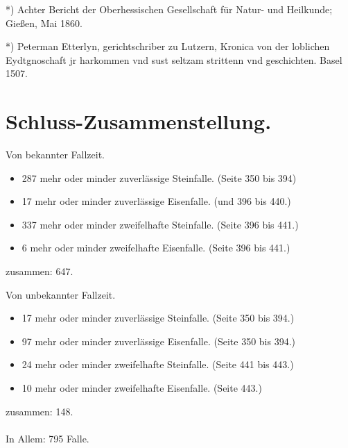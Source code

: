 \documentclass[a4paper, 8pt, oneside, polutonikogreek, german]{article}
\begin{document}
*) Achter Bericht der Oberhessischen Gesellschaft für Natur- und Heilkunde; Gießen, Mai 1860.

*) Peterman Etterlyn, gerichtschriber zu Lutzern, Kronica von der loblichen Eydtgnoschaft jr harkommen vnd sust seltzam strittenn vnd geschichten. Basel 1507.
\clearpage
\section{Schluss-Zusammenstellung.}
\begin{center}
Von bekannter Fallzeit.
\end{center}
\begin{itemize}
    \item 287 mehr oder minder zuverlässige Steinfalle. (Seite 350 bis 394)
    \item 17 mehr oder minder zuverlässige Eisenfalle. (und 396 bis 440.)
    \item 337 mehr oder minder zweifelhafte Steinfalle. (Seite 396 bis 441.)
    \item 6 mehr oder minder zweifelhafte Eisenfalle. (Seite 396 bis 441.)
\end{itemize}
\begin{center}
zusammen: 647.
\end{center}
\begin{center}
Von unbekannter Fallzeit.
\end{center}
\begin{itemize}
    \item 17 mehr oder minder zuverlässige Steinfalle. (Seite 350 bis 394.)
    \item 97 mehr oder minder zuverlässige Eisenfalle. (Seite 350 bis 394.)
    \item 24 mehr oder minder zweifelhafte Steinfalle. (Seite 441 bis 443.)
    \item 10 mehr oder minder zweifelhafte Eisenfalle. (Seite 443.)
\end{itemize}
\begin{center}
zusammen: 148.
\end{center}

\paragraph{}
In Allem: 795 Falle.
\end{document}
